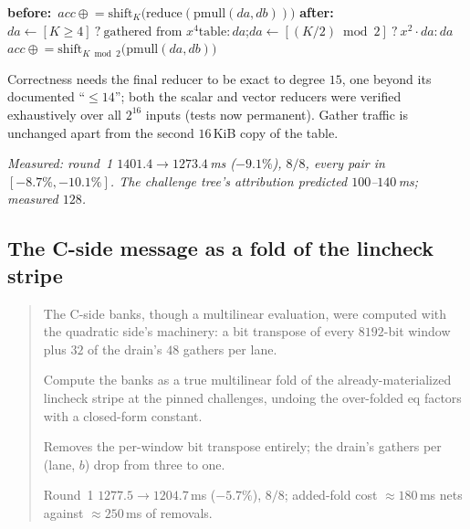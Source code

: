 \documentclass[11pt]{article}
\newcommand{\code}[1]{\texttt{#1}}
\newenvironment{optsummary}{%
  \begin{quote}\small
  \begin{description}
  \setlength{\itemsep}{1pt}\setlength{\parsep}{0pt}\setlength{\topsep}{2pt}
}{%
  \end{description}
  \end{quote}
}
\begin{document}
\begin{algorithm}[h]
\caption{Row-block accumulate, before and after}
\begin{algorithmic}[1]
\State \textbf{before:}\ $\mathit{acc} \mathrel{\oplus}=
  \mathrm{shift}_K\!\big(\mathrm{reduce}(\mathrm{pmull}(da, db))\big)$
  \Comment{$6$ \code{PMULL}}
\State \textbf{after:}\ \ $da \gets [K\ge4]\ ?\ \text{gathered from }x^4\text{
  table} : da$;\quad $da \gets [(K/2)\bmod 2]\ ?\ x^2\!\cdot\!da : da$
\State {}\ $\mathit{acc} \mathrel{\oplus}=
  \mathrm{shift}_{K\bmod2}\!\big(\mathrm{pmull}(da, db)\big)$
  \Comment{$2$ \code{PMULL}}
\end{algorithmic}
\end{algorithm}

Correctness needs the final reducer to be exact to degree $15$, one beyond its
documented ``$\le14$''; both the scalar and vector reducers were verified
exhaustively over all $2^{16}$ inputs (tests now permanent). Gather traffic is
unchanged apart from the second $16\,$KiB copy of the table.

\emph{Measured: round~1 $1401.4\to1273.4\,$ms ($-9.1\%$), $8/8$, every pair in
$[-8.7\%,-10.1\%]$. The challenge tree's attribution predicted
$100$--$140\,$ms; measured $128$.}

\subsection{The C-side message as a fold of the lincheck stripe}
\label{sec:stripe}

\begin{optsummary}
\item[Baseline:] The C-side banks, though a multilinear evaluation, were computed with the quadratic side's machinery: a bit transpose of every $8192$-bit window plus $32$ of the drain's $48$ gathers per lane.
\item[Improvement:] Compute the banks as a true multilinear fold of the already-materialized lincheck stripe at the pinned challenges, undoing the over-folded eq factors with a closed-form constant.
\item[Mechanism:] Removes the per-window bit transpose entirely; the drain's gathers per (lane, $b$) drop from three to one.
\item[Result:] Round~1 $1277.5\to1204.7\,$ms ($-5.7\%$), $8/8$; added-fold cost $\approx180\,$ms nets against $\approx250\,$ms of removals.
\end{optsummary}
\end{document}
